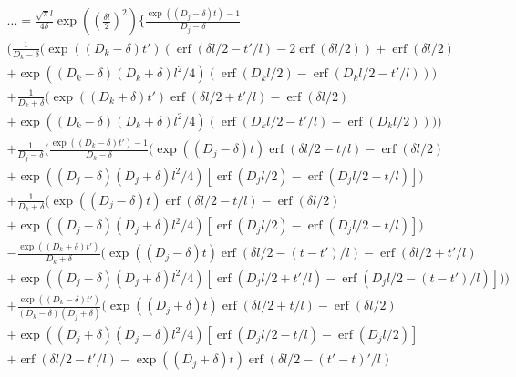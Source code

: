 \documentclass[a4paper]{article}
\newcommand{\erf}{\operatorname{erf}}
\begin{document}
\begin{multline}
  ...
  = 
  \frac{\sqrt{\pi}l}{4\delta}\exp\left(\left(\frac{\delta l}{2}\right)^2\right)
  \bigg\{
  \frac{\exp((D_j-\delta) t) - 1}{D_j-\delta} \\
  \bigg(
  \frac{1}{D_k-\delta}
  \bigg(
  \exp((D_k-\delta)t') (\erf(\delta l/2 - t'/l) - 2\erf(\delta l/2))
  + \erf(\delta l/2) \\
  + \exp((D_k-\delta)(D_k+\delta)l^2/4)
  (\erf(D_k l/2) - \erf(D_k l/2  - t'/l) )
  \bigg) \\
  + \frac{1}{D_k+\delta}
  \bigg(
  \exp((D_k+\delta)t') \erf(\delta l/2 + t'/l) - \erf(\delta l/2) \\
  + \exp((D_k-\delta)(D_k+\delta)l^2/4)
  (\erf(D_k l/2  - t'/l) - \erf(D_k l/2))
  \bigg)  
  \bigg) \\
  +
  \frac{1}{D_j - \delta} \bigg(
  \frac{\exp((D_k-\delta) t') - 1}{D_k-\delta}
  \bigg(\exp((D_j-\delta) t) \erf(\delta l/2 - t/l) - \erf(\delta l/2)
  \\
  + \exp((D_j - \delta)(D_j + \delta)l^2/4)[\erf(D_j l/2) - \erf(D_j
  l/2 - t/l) ]\bigg) \\
  +
  \frac{1}{D_k+\delta}
  \bigg(\exp((D_j-\delta) t) \erf(\delta l/2 - t/l) - \erf(\delta l/2)
  \\
  + \exp((D_j - \delta)(D_j + \delta)l^2/4)[\erf(D_j l/2) - \erf(D_j
  l/2 - t/l) ]\bigg)
  \\
  - \frac{\exp((D_k+\delta)t')}{D_k+\delta} \bigg(
  \exp((D_j-\delta) t) \erf(\delta l/2 - (t-t')/l) - \erf(\delta l/2 +
  t'/l) \\
  + \exp((D_j - \delta)(D_j + \delta)l^2/4)[\erf(D_j l/2 + t'/l) - \erf(D_j
  l/2 - (t-t')/l) ]
  \bigg)
  \bigg) \\
  +
  \frac{\exp((D_k-\delta) t')}{(D_k-\delta)(D_j+\delta)}
  \bigg(
  \exp((D_j + \delta) t) \erf(\delta l/2 + t/l) - \erf(\delta l / 2) \\
  + \exp((D_j + \delta)(D_j - \delta)l^2/4)[\erf(D_j l/2 - t/l) -
  \erf(D_j l/2)] \\
  + \erf(\delta l / 2 - t'/l) - 
  \exp((D_j + \delta) t) \erf(\delta l / 2 - (t'-t)'/l) \\

\end{multline}
\end{document}
